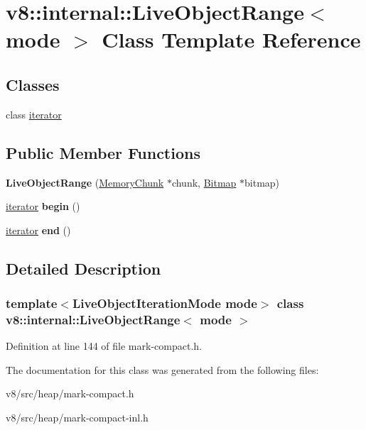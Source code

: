 \hypertarget{classv8_1_1internal_1_1LiveObjectRange}{}\section{v8\+:\+:internal\+:\+:Live\+Object\+Range$<$ mode $>$ Class Template Reference}
\label{classv8_1_1internal_1_1LiveObjectRange}
\subsection*{Classes}
\begin{DoxyCompactItemize}
\item 
class \mbox{\hyperlink{classv8_1_1internal_1_1LiveObjectRange_1_1iterator}{iterator}}
\end{DoxyCompactItemize}
\subsection*{Public Member Functions}
\begin{DoxyCompactItemize}
\item 
\mbox{\label{classv8_1_1internal_1_1LiveObjectRange_adad2c7a1596856464e2ba8b566a79390}} 
{\bfseries Live\+Object\+Range} (\mbox{\hyperlink{classv8_1_1internal_1_1MemoryChunk}{Memory\+Chunk}} $\ast$chunk, \mbox{\hyperlink{classv8_1_1internal_1_1Bitmap}{Bitmap}} $\ast$bitmap)
\item 
\mbox{\label{classv8_1_1internal_1_1LiveObjectRange_a365e047f6d44b2653f823277da9edf61}} 
\mbox{\hyperlink{classv8_1_1internal_1_1LiveObjectRange_1_1iterator}{iterator}} {\bfseries begin} ()
\item 
\mbox{\label{classv8_1_1internal_1_1LiveObjectRange_ab61082a0e6d29083b1d1e6d50dfdad64}} 
\mbox{\hyperlink{classv8_1_1internal_1_1LiveObjectRange_1_1iterator}{iterator}} {\bfseries end} ()
\end{DoxyCompactItemize}


\subsection{Detailed Description}
\subsubsection*{template$<$Live\+Object\+Iteration\+Mode mode$>$\newline
class v8\+::internal\+::\+Live\+Object\+Range$<$ mode $>$}



Definition at line 144 of file mark-\/compact.\+h.



The documentation for this class was generated from the following files\+:\begin{DoxyCompactItemize}
\item 
v8/src/heap/mark-\/compact.\+h\item 
v8/src/heap/mark-\/compact-\/inl.\+h\end{DoxyCompactItemize}
